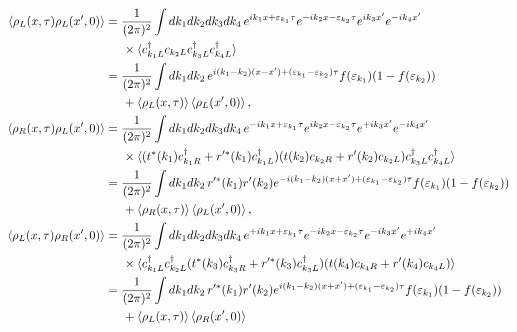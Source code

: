 \documentclass[10pt,a4j]{jarticle}
\begin{document}
\begin{align}
\braket{\rho_{L}(x,\tau) \rho_{L}(x^\prime,0)} & = \frac{1}{(2\pi)^2} \int dk_1 dk_2 dk_3 dk_4 \,
e^{ik_1x+\varepsilon_{k_1}\tau}e^{-ik_2x-\varepsilon_{k_2}\tau}e^{ik_3x^\prime}e^{-ik_4x^\prime} \nonumber \\
& \hspace{5mm} \times \langle c^\dagger_{k_1L} c_{k_2L} c^\dagger_{k_3L} c^\dagger_{k_4L} \rangle  \nonumber \\
& =  \frac{1}{(2\pi)^2} \int dk_1 dk_2 \, e^{i(k_1-k_2)(x-x^\prime) + (\varepsilon_{k_1} - \varepsilon_{k_2})\tau}
f(\varepsilon_{k_1})(1 - f(\varepsilon_{k_2})) \nonumber \\
& \hspace{5mm} + \braket{\rho_{L}(x,\tau)}  \braket{ \rho_{L}(x^\prime,0)}  , \\
\braket{\rho_{R}(x,\tau) \rho_{L}(x^\prime,0)} 
& = \frac{1}{(2\pi)^2} \int dk_1 dk_2 dk_3 dk_4 \,
e^{-ik_1x+\varepsilon_{k_1}\tau}e^{ik_2x-\varepsilon_{k_2}\tau}e^{+ik_3x^\prime}e^{-ik_4x^\prime} \nonumber \\
& \hspace{5mm} \times \langle (t^{*} (k_1)c^\dagger_{k_1R} + r^{\prime*}(k_1) c^\dagger_{k_1L})
 (t(k_2) c_{k_2R} + r^\prime(k_2) c_{k_2L}) c^\dagger_{k_3L} c^\dagger_{k_4L} \rangle  \nonumber \\
& =  \frac{1}{(2\pi)^2} \int dk_1 dk_2 \, r^{\prime*}(k_1)r^\prime(k_2) 
e^{-i(k_1-k_2)(x+x^\prime) + (\varepsilon_{k_1} - \varepsilon_{k_2})\tau}
f(\varepsilon_{k_1})(1 - f(\varepsilon_{k_2})) \nonumber \\
& \hspace{5mm} + \braket{\rho_{R}(x,\tau)}  \braket{ \rho_{L}(x^\prime,0)}  , \\
\braket{\rho_{L}(x,\tau) \rho_{R}(x^\prime,0)} 
& = \frac{1}{(2\pi)^2} \int dk_1 dk_2 dk_3 dk_4 \,
e^{+ik_1x+\varepsilon_{k_1}\tau}e^{-ik_2x-\varepsilon_{k_2}\tau}e^{-ik_3x^\prime}e^{+ik_4x^\prime} \nonumber \\
& \hspace{5mm} \times \langle c^\dagger_{k_1L} c^\dagger_{k_2L}
(t^{*} (k_3)c^\dagger_{k_3R} + r^{\prime*}(k_3) c^\dagger_{k_3L})
 (t(k_4) c_{k_4R} + r^\prime(k_4) c_{k_4L})  \rangle  \nonumber \\
& =  \frac{1}{(2\pi)^2} \int dk_1 dk_2 \, r^{\prime*}(k_1)r^\prime(k_2) 
e^{i(k_1-k_2)(x+x^\prime) + (\varepsilon_{k_1} - \varepsilon_{k_2})\tau}
f(\varepsilon_{k_1})(1 - f(\varepsilon_{k_2})) \nonumber \\
& \hspace{5mm} + \braket{\rho_{L}(x,\tau)}  \braket{ \rho_{R}(x^\prime,0)}  
\end{align}
\end{document}
